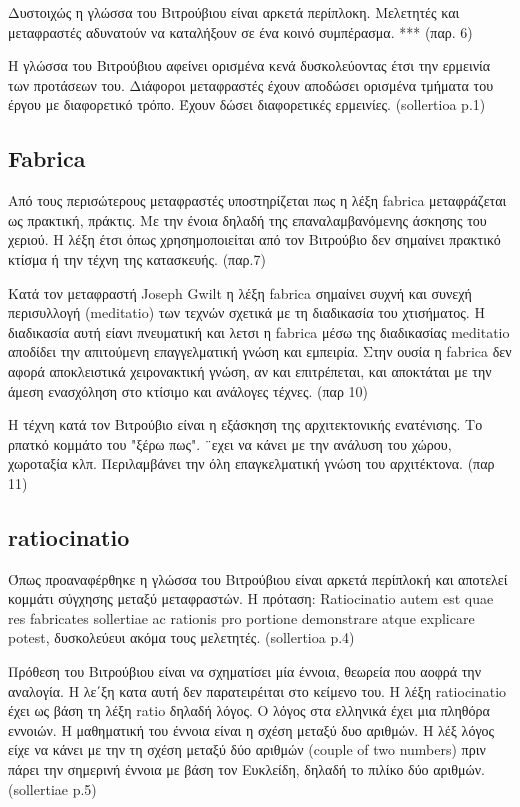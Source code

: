 Δυστοιχώς η γλώσσα του Βιτρούβιου είναι αρκετά περίπλοκη. Μελετητές και
μεταφραστές αδυνατούν να καταλήξουν σε ένα κοινό συμπέρασμα. *** (παρ. 6)

Η γλώσσα του Βιτρούβιου αφείνει ορισμένα κενά δυσκολεύοντας έτσι την ερμεινία
των προτάσεων του. Διάφοροι μεταφραστές έχουν αποδώσει ορισμένα τμήματα του
έργου με διαφορετικό τρόπο. Έχουν δώσει διαφορετικές ερμεινίες. (sollertioa p.1)

\subsection{Fabrica}

Από τους περισώτερους μεταφραστές υποστηρίζεται πως η λέξη fabrica μεταφράζεται
ως πρακτική, πράκτις. Με την ένοια δηλαδή της επαναλαμβανόμενης άσκησης του
χεριού. Η λέξη έτσι όπως χρησημοποιείται από τον Βιτρούβιο δεν σημαίνει πρακτικό
κτίσμα ή την τέχνη της κατασκευής. (παρ.7)

Κατά τον μεταφραστή Joseph Gwilt η λέξη fabrica σημαίνει συχνή και συνεχή
περισυλλογή (meditatio) των τεχνών σχετικά με τη διαδικασία του χτισήματος. Η
διαδικασία αυτή είανι πνευματική και λετσι η fabrica μέσω της διαδικασίας
meditatio αποδίδει την απιτούμενη επαγγελματική γνώση και εμπειρία. Στην ουσία η
fabrica δεν αφορά αποκλειστικά χειρονακτική γνώση, αν και επιτρέπεται, και
αποκτάται με την άμεση ενασχόληση στο κτίσιμο και ανάλογες τέχνες. (παρ 10)

Η τέχνη κατά τον Βιτρούβιο είναι η εξάσκηση της αρχιτεκτονικής ενατένισης. Το
ρπατκό κομμάτο του "ξέρω πως". ¨εχει να κάνει με την ανάλυση του χώρου,
χωροταξία κλπ. Περιλαμβάνει την όλη επαγκελματική γνώση του αρχιτέκτονα. (παρ
11)

\subsection{ratiocinatio}

Όπως προαναφέρθηκε η γλώσσα του Βιτρούβιου είναι αρκετά περίπλοκή και αποτελεί
κομμάτι σύγχησης μεταξύ μεταφραστών. Η πρόταση:  Ratiocinatio autem est quae res
fabricates sollertiae ac
rationis pro portione demonstrare atque explicare potest, δυσκολεύευι ακόμα τους
μελετητές. (sollertioa p.4)

Πρόθεση του Βιτρούβιου είναι να σχηματίσει μία έννοια, θεωρεία που αοφρά την
αναλογία. Η λε΄ξη κατα αυτή δεν παρατειρέιται στο κείμενο του. Η λέξη
ratiocinatio έχει ως βάση τη λέξη ratio δηλαδή λόγος. Ο λόγος στα ελληνικά έχει
μια πληθόρα εννοιών. Η μαθηματική του έννοια είναι η σχέση μεταξύ δυο αριθμών. Η
λέξ λόγος είχε να κάνει με την τη σχέση μεταξύ δύο αριθμών (couple of two
numbers) πριν πάρει την σημερινή έννοια με βάση τον Ευκλείδη, δηλαδή το πιλίκο
δύο αριθμών. (sollertiae p.5)

